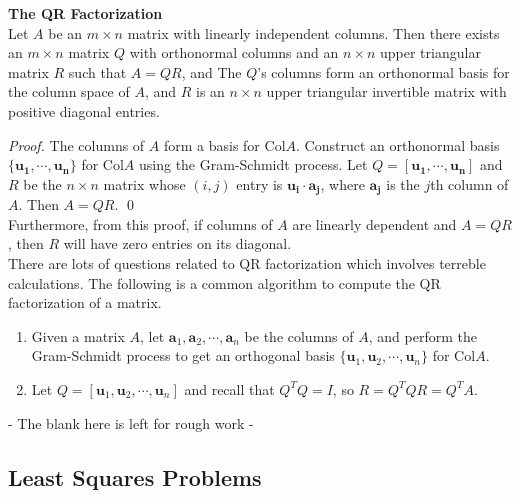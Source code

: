 \documentclass[10pt, a4paper]{article}
\newcommand{\vt}[1]{\mathbf{#1}}
\begin{document}
\begin{proposition}
    \textbf{The QR Factorization}\\
    Let $A$ be an $m\times n$ matrix with linearly independent columns. Then there exists an $m\times n$ matrix $Q$ with orthonormal columns and an $n\times n$ upper triangular matrix $R$ such that $A=QR$, and
    The $Q$'s columns form an orthonormal basis for the column space of $A$, and $R$ is an $n\times n$ upper triangular invertible matrix with positive diagonal entries.
\end{proposition}
\indent \textit{Proof.} The columns of $A$ form a basis for Col$A$. Construct an orthonormal basis $\{\vt{u_1}, \cdots, \vt{u_n}\}$ for Col$A$ using the Gram-Schmidt process. 
Let $Q=[\vt{u_1}, \cdots, \vt{u_n}]$ and $R$ be the $n\times n$ matrix whose $(i,j)$ entry is $\vt{u_i}\cdot\vt{a_j}$, where $\vt{a_j}$ is the $j$th column of $A$. Then $A=QR$. \qed \\
\indent Furthermore, from this proof, if columns of $A$ are linearly dependent and $A=QR$, then $R$ will have zero entries on its diagonal.\\
\indent There are lots of questions related to QR factorization which involves terreble calculations. The following is a common algorithm to compute the QR factorization of a matrix.
\begin{enumerate}
    \item Given a matrix $A$, let $\vt{a}_1, \vt{a}_2, \cdots, \vt{a}_n$ be the columns of $A$, and perform the Gram-Schmidt process to get an orthogonal basis $\{\vt{u}_1, \vt{u}_2, \cdots, \vt{u}_n\}$ for Col$A$.
    \item Let $Q=[\vt{u}_1, \vt{u}_2, \cdots, \vt{u}_n]$ and recall that $Q^TQ=I$, so $R=Q^TQR=Q^TA$.
\end{enumerate}
\indent \indent - The blank here is left for rough work -
\newpage



\subsection{Least Squares Problems}
\end{document}
